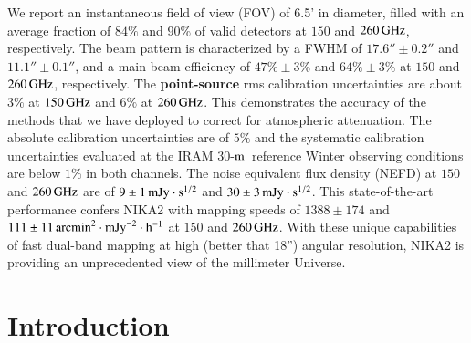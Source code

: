 \documentclass[traditionalabstract]{aa}
\newcommand{\trentemetre}{30-$\rm{m}$}
\newcommand{\lp}[1]{#1}
\newcommand{\rev}[1]{\bf \color[RGB]{0, 153, 255} #1}
\begin{document}
       {We report an instantaneous field of view (FOV) of 6.5'
         in diameter, filled with an average fraction of $84\%$ and 
         $90\%$ of %
         valid detectors
         at $150$ and $260\,\rm{GHz}$, respectively. The beam pattern
         is characterized by a FWHM of $17.6'' \pm 0.2''$
         and  $11.1''\pm 0.1''$, and a main beam efficiency of
         {\rev $47\% \pm 3\%$} and {\rev $64\% \pm 3\%$}
         at $150$ and $260\,\rm{GHz}$, respectively.
         The {\rev point-source} rms calibration uncertainties are about $3\%$ at $150\,\rm{GHz}$ 
         and $6\%$ at $260\,\rm{GHz}$. This demonstrates
         the accuracy of the methods that we have deployed to correct
         for atmospheric attenuation.
         {\lp The absolute
           calibration uncertainties are of $5\%$ and the systematic
           calibration uncertainties evaluated at the IRAM
           \trentemetre\ reference Winter observing conditions are
           below $1\%$ in both channels.}
         The noise equivalent
         flux density (NEFD) at $150$ and $260\,\rm{GHz}$ are of
         $9 \pm 1\, \rm{mJy}\cdot s^{1/2}$ and
         $30 \pm 3\, \rm{mJy}\cdot s^{1/2}$. 
         This state-of-the-art performance confers NIKA2 with
         mapping speeds of $1388 \pm 174$ and
         $111 \pm 11 \, \rm{arcmin}^2\cdot \rm{mJy}^{-2}\cdot
         \rm{h}^{-1}$
         at $150$ and $260\,\rm{GHz}$.}
       {With these unique capabilities of fast dual-band mapping at
         high (better that 18'') angular resolution, NIKA2 is providing an unprecedented view
         of the millimeter Universe.}      
   \maketitle
\section{Introduction}
\label{se:intro}

\end{document}
